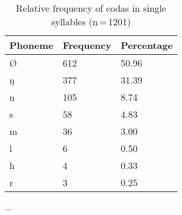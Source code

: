 \begin{table}[hp]\centering
\caption[Relative frequency of codas in single syllables]{Relative frequency of codas in single syllables (n\,=\,1201)}
\begin{tabu} to 0.5\textwidth{X X[c] X[c]}
\tableheaderfont\toprule
Phoneme
	& Frequency
	& Percentage
	\\
	
\toprule

Ø	&	612	&	50.96\pct\\

\midrule

ŋ	&	377	&	31.39\pct\\
n	&	105	&	8.74\pct\\
s	&	58	&	4.83\pct\\
m	&	36	&	3.00\pct\\
l	&	6	&	0.50\pct\\
h	&	4	&	0.33\pct\\
r	&	3	&	0.25\pct\\

\bottomrule
\end{tabu}
\label{tab:singcod}
\end{table}

...
